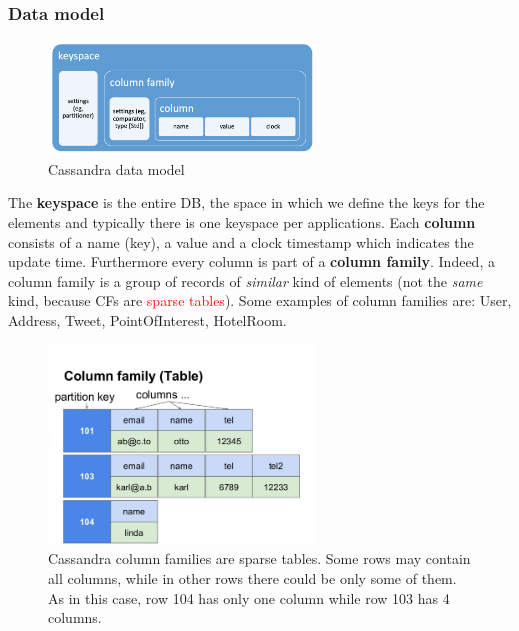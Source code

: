 \documentclass[10pt,a4paper]{article}
\begin{document}
\subsubsection{Data model}
\begin{figure}[ht!]
 \hfill \includegraphics[width=200pt]{images/cassandra-data-model2.png}\hspace*{\fill}
  \caption{Cassandra data model}
\end{figure} 
 The \textbf{keyspace} is the entire DB, the space in which we define the keys for the elements and typically there is one keyspace per applications. Each \textbf{column} consists of a name (key), a value and a clock timestamp which indicates the update time. Furthermore every column is part of a \textbf{column family}. Indeed, a column family is a group of records of \textit{similar} kind of elements (not the \textit{same} kind, because CFs are \textcolor{red}{sparse tables}). Some examples of column families are: User, Address, Tweet, PointOfInterest, HotelRoom.
 
 \begin{figure}[ht!]
 \hfill \includegraphics[width=200pt]{images/cassandra-column-family.jpg}\hspace*{\fill}
  \caption{Cassandra column families are sparse tables. Some rows may contain all columns, while in other rows there could be only some of them. As in this case, row 104 has only one column while row 103 has 4 columns.}
\end{figure} 
\end{document}
